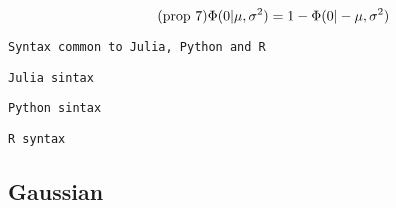 \documentclass[article]{jss}
\newif\ifen
\newif\ifes
\newcommand{\en}[1]{\ifen#1\fi}
\newcommand{\es}[1]{\ifes#1\fi}
\begin{document}
\begin{equation}\label{eq:phi_simetria} \tag{\text{prop 7}}
\Phi(0|\mu,\sigma^2) = 1-\Phi(0|-\mu,\sigma^2)
\end{equation}
%
\en{Because we develop packages in three programming languages, by displaying code we will identify each syntax as follows.}
\es{Debido a que desarrollamos paquetes en tres lenguajes de programaci\'on, al mostrar c\'odigo identificaremos cada sintaxis del siguiente modo.}
%
\begin{lstlisting}[backgroundcolor=\color{all}, belowskip=-0.77 \baselineskip]
Syntax common to Julia, Python and R
\end{lstlisting}
\begin{paracol}{3}
\begin{lstlisting}[backgroundcolor=\color{julia}]
Julia sintax
\end{lstlisting}
  \switchcolumn
\begin{lstlisting}[backgroundcolor=\color{python}]
Python sintax
\end{lstlisting}
   \switchcolumn
\begin{lstlisting}[backgroundcolor=\color{r}]
R syntax
\end{lstlisting}  
\end{paracol}
%

\subsection{Gaussian}\label{sec:Gasussian}
\end{document}
